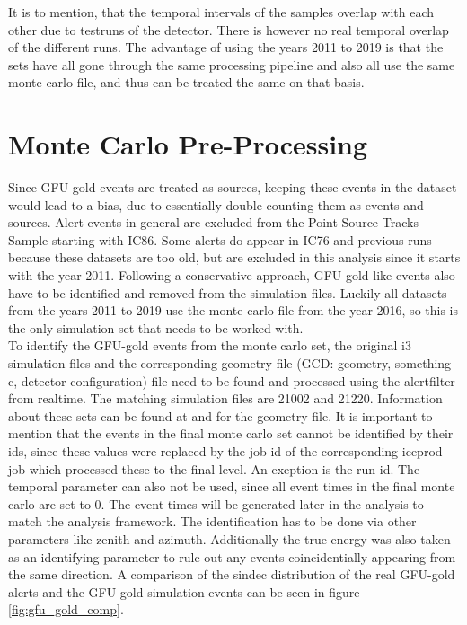 It is to mention, that the temporal intervals of the samples overlap with each other due to testruns of the detector.
There is however no real temporal overlap of the different runs. \cite{private_com}
The advantage of using the years 2011 to 2019 is that the sets have all gone through the same processing pipeline and also all use the same monte carlo file, and thus can be treated the same on that basis.

\section{Monte Carlo Pre-Processing}

Since GFU-gold events are treated as sources, keeping these events in the dataset would lead to a bias, due to essentially double counting them as events and sources.
Alert events in general are excluded from the Point Source Tracks Sample starting with IC86.
Some alerts do appear in IC76 and previous runs because these datasets are too old, but are excluded in this analysis since it starts with the year 2011.
Following a conservative approach, GFU-gold like events also have to be identified and removed from the simulation files.
Luckily all datasets from the years 2011 to 2019 use the monte carlo file from the year 2016, so this is the only simulation set that needs to be worked with.\\
To identify the GFU-gold events from the monte carlo set, the original i3 simulation files and the corresponding geometry file (GCD: geometry, something c, detector configuration) file need to be found and processed using the alertfilter from realtime.
The matching simulation files are 21002 and 21220.
Information about these sets can be found at \cite{sim} and \cite{gcd} for the geometry file.
It is important to mention that the events in the final monte carlo set cannot be identified by their ids, since these values were replaced by the job-id of the corresponding iceprod job which processed these to the final level. An exeption is the run-id.
The temporal parameter can also not be used, since all event times in the final monte carlo are set to \num{0}.
The event times will be generated later in the analysis to match the analysis framework.
The identification has to be done via other parameters like zenith and azimuth.
Additionally the true energy was also taken as an identifying parameter to rule out any events coincidentially appearing from the same direction.
A comparison of the sindec distribution of the real GFU-gold alerts and the GFU-gold simulation events can be seen in figure \ref{fig:gfu_gold_comp}.

